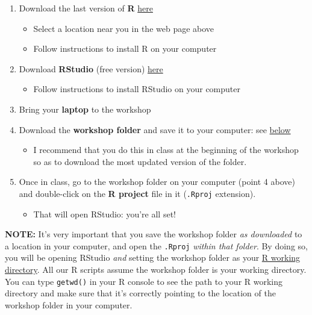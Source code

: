 \documentclass[
]{book}
\providecommand{\tightlist}{%
  \setlength{\itemsep}{0pt}\setlength{\parskip}{0pt}}
\begin{document}
\begin{enumerate}
\def\labelenumi{\arabic{enumi}.}
\tightlist
\item
  Download the last version of \textbf{R} \href{https://cran.r-project.org/mirrors.html}{here}

  \begin{itemize}
  \tightlist
  \item
    Select a location near you in the web page above
  \item
    Follow instructions to install R on your computer
  \end{itemize}
\item
  Download \textbf{RStudio} (free version) \href{https://www.rstudio.com/products/rstudio/download/}{here}

  \begin{itemize}
  \tightlist
  \item
    Follow instructions to install RStudio on your computer
  \end{itemize}
\item
  Bring your \textbf{laptop} to the workshop
\item
  Download the \textbf{workshop folder} and save it to your computer: see \protect\hyperlink{materials}{below}

  \begin{itemize}
  \tightlist
  \item
    I recommend that you do this in class at the beginning of the workshop so as to download the most updated version of the folder.
  \end{itemize}
\item
  Once in class, go to the workshop folder on your computer (point 4 above) and double-click on the \textbf{R project} file in it (\texttt{.Rproj} extension).

  \begin{itemize}
  \tightlist
  \item
    That will open RStudio: you're all set!
  \end{itemize}
\end{enumerate}

\textbf{NOTE:} It's very important that you save the workshop folder \emph{as downloaded} to a location in your computer, and open the \texttt{.Rproj} \emph{within that folder}. By doing so, you will be opening RStudio \emph{and} setting the workshop folder as your \protect\hyperlink{starting-R-and-loading-packages}{R working directory}. All our R scripts assume the workshop folder is your working directory. You can type \texttt{getwd()} in your R console to see the path to your R working directory and make sure that it's correctly pointing to the location of the workshop folder in your computer.
\end{document}
